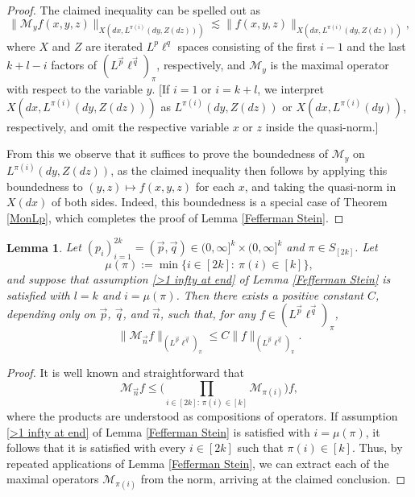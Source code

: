 \documentclass[11pt, reqno]{amsart}
\newtheorem{lemma}[theorem]{Lemma}
\theoremstyle{definition}
\theoremstyle{remark}
\numberwithin{equation}{section}
\newcommand{\vn}{\vec n}
\newcommand{\vp}{\vec p}
\newcommand{\vq}{\vec q}
\newcommand{\Norm}[2]{\|#1\|_{#2}}
\begin{document}
\begin{proof}
The claimed inequality can be spelled out as
\begin{equation*}
\Norm{  \mathcal M_{y}f(x,y,z)  }{X(dx,L^{\pi(i)}(dy,Z(dz)))} \lesssim \Norm{ f(x,y,z)  }{X(dx,L^{\pi(i)}(dy,Z(dz)))},
\end{equation*}
where $X$ and $Z$ are iterated $L^p\ell^q$ spaces consisting of the first $i-1$ and the last $k+l-i$ factors of $(L^{\vp}\ell^{\vq})_\pi$, respectively, and $\mathcal M_y$ is the maximal operator with respect to the variable $y$. [If $i=1$ or $i=k+l$, we interpret $X(dx,L^{\pi(i)}(dy,Z(dz)))$ as $L^{\pi(i)}(dy,Z(dz))$ or $X(dx,L^{\pi(i)}(dy))$, respectively, and omit the respective variable $x$ or $z$ inside the quasi-norm.]

From this we observe that it suffices to prove the boundedness of $\mathcal M_y$ on $L^{\pi(i)}(dy,Z(dz))$, as the claimed inequality then follows by applying this boundedness to $(y,z)\mapsto f(x,y,z)$ for each $x$, and taking the quasi-norm in $X(dx)$ of both sides.
Indeed, this boundedness is a special case of Theorem \ref{MonLp},
which completes the proof of Lemma \ref{Fefferman Stein}.
\end{proof}

\begin{lemma}\label{FS strong}
Let $(p_i)_{i=1}^{2k}=(\vp,\vq)\in(0,\infty]^k\times(0,\infty]^{k}$ and $\pi\in S_{[2k]}$.
Let
\begin{equation}\label{mu}
\mu(\pi):=\min\{i\in[2k]:\ \pi(i)\in[k]\},
\end{equation}
and suppose that assumption \eqref{>1 infty at end} of Lemma \ref{Fefferman Stein} is satisfied with $l=k$ and $i=\mu(\pi)$.
Then there exists a positive constant $C$,
depending only on $\vp$, $\vq$, and $\vn$, such that,
for any  $f\in (L^{\vp}\ell^{\vq})_\pi$,
\begin{equation*}
\Norm{ \mathcal M_{\vn}f }{(L^{\vp}\ell^{\vq})_\pi}
\le C  \Norm{ f }{(L^{\vp}\ell^{\vq})_\pi}.
\end{equation*}
\end{lemma}

\begin{proof}
It is well known and straightforward that
\begin{equation*}
\mathcal M_{\vn}f\leq \Bigg(\prod_{i\in[2k]:\,\pi(i)\in[k]} \mathcal M_{\pi(i)}\Bigg) f,
\end{equation*}
where the products are understood as compositions of operators. If assumption \eqref{>1 infty at end} of Lemma \ref{Fefferman Stein} is satisfied with $i=\mu(\pi)$, it follows that it is satisfied with every $i\in[2k]$ such that $\pi(i)\in[k]$. Thus, by repeated applications of Lemma \ref{Fefferman Stein}, we can extract each of the maximal operators $\mathcal M_{\pi(i)}$ from the norm, arriving at the claimed conclusion.
\end{proof}
\end{document}

